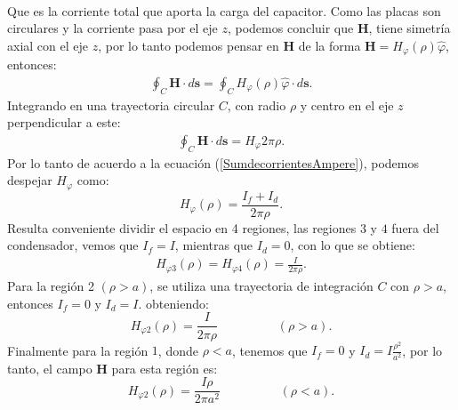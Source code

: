 \documentclass[11pt,fleqn]{book} %
\begin{document}
\begin{example}
\begin{eqnarray*}
\end{eqnarray*}
Que es la corriente total que aporta la carga del capacitor. Como las placas son circulares y la corriente pasa por el eje $z$, podemos concluir que $\textbf{H}$, tiene simetr\'ia axial con el eje $z$, por lo tanto podemos pensar en $\textbf{H}$ de la forma $ \textbf{H}=H_{\varphi}(\rho)\hat{\varphi}$, entonces:\\
\begin{eqnarray*}
\oint_{C} \textbf{H} \cdot d\textbf{s}=\oint_{C} H_{\varphi}(\rho)\hat{\varphi} \cdot d\textbf{s}.
\end{eqnarray*}
Integrando en una trayectoria circular $C$, con radio $\rho$ y centro en el eje $z$ perpendicular a este:
\begin{eqnarray*}
\oint_{C} \textbf{H} \cdot d\textbf{s}=H_{\varphi} 2 \pi \rho.
\end{eqnarray*}
Por lo tanto de acuerdo a la ecuaci\'on (\ref{SumdecorrientesAmpere}), podemos despejar $H_{\varphi}$ como:
\begin{equation}
H_{\varphi}(\rho)=\frac{I_{f}+I_{d}}{2 \pi \rho}.
\end{equation}
Resulta conveniente dividir el espacio en 4 regiones, las regiones $3$ y $4$ fuera del condensador, vemos que $I_{f}=I$, mientras que $I_{d}=0$, con lo que se obtiene:
\begin{eqnarray*}
H_{\varphi 3}(\rho)=H_{\varphi 4}(\rho)=\frac{I}{2 \pi \rho}.
\end{eqnarray*}
Para la regi\'on 2 $(\rho>a)$, se utiliza una trayectoria de integraci\'on $C$ con $\rho>a$, entonces $I_{f}=0$ y $I_{d}=I$. obteniendo:
\begin{equation}
H_{\varphi 2}(\rho)=\frac{I}{2 \pi \rho}  \hspace{2cm} (\rho>a).
\end{equation}
Finalmente para la regi\'on $1$, donde $\rho<a$, tenemos que $I_{f}=0$ y $I_{d}=I\frac{\rho^{2}}{a^{2}}$, por lo tanto, el campo $\textbf{H}$ para esta regi\'on es:
\begin{equation}
H_{\varphi 2}(\rho)=\frac{I\rho}{2 \pi a^{2}}  \hspace{2cm} (\rho<a).
\end{equation}
\end{example}
\end{document}
